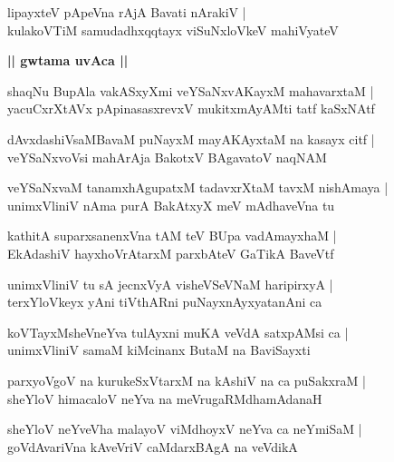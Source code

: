 \documentclass[twoside,12pt,openright]{book}
\newcounter{shloka}[chapter]
\def\uvaca#1{\centerline{{\large\textbf{#1}}}}
\begin{document}
\begin{shloka}%
lipayxteV pApeVna rAjA Bavati nArakiV |\\
kulakoVTiM samudadhxqqtayx viSuNxloVkeV mahiVyateV 
\end{shloka}

\uvaca{|| gwtama uvAca ||}

\begin{shloka}%
shaqNu BupAla vakASxyXmi veYSaNxvAKayxM mahavarxtaM |\\
yacuCxrXtAVx pApinasasxrevxV mukitxmAyAMti tatf kaSxNAtf 
\end{shloka}

\begin{shloka}%
dAvxdashiVsaMBavaM puNayxM mayAKAyxtaM na kasayx citf |\\
veYSaNxvoVsi mahArAja BakotxV BAgavatoV naqNAM 
\end{shloka}

\begin{shloka}%
veYSaNxvaM tanamxhAgupatxM tadavxrXtaM tavxM nishAmaya |\\
unimxVliniV nAma purA BakAtxyX meV mAdhaveVna tu
\end{shloka}

\begin{shloka}%
kathitA suparxsanenxVna tAM teV BUpa vadAmayxhaM |\\
EkAdashiV hayxhoVrAtarxM parxbAteV GaTikA BaveVtf
\end{shloka}

\begin{shloka}%
unimxVliniV tu sA jecnxVyA visheVSeVNaM haripirxyA |\\
terxYloVkeyx yAni tiVthARni puNayxnAyxyatanAni ca 
\end{shloka}

\begin{shloka}%
koVTayxMsheVneYva tulAyxni muKA veVdA satxpAMsi ca |\\
unimxVliniV samaM kiMcinanx ButaM na BaviSayxti
\end{shloka}

\begin{shloka}%
parxyoVgoV na kurukeSxVtarxM na kAshiV na ca puSakxraM |\\
sheYloV himacaloV neYva na meVrugaRMdhamAdanaH 
\end{shloka}

\begin{shloka}%
sheYloV neYveVha malayoV viMdhoyxV neYva ca neYmiSaM |\\
goVdAvariVna kAveVriV caMdarxBAgA na veVdikA
\end{shloka}
\end{document}
